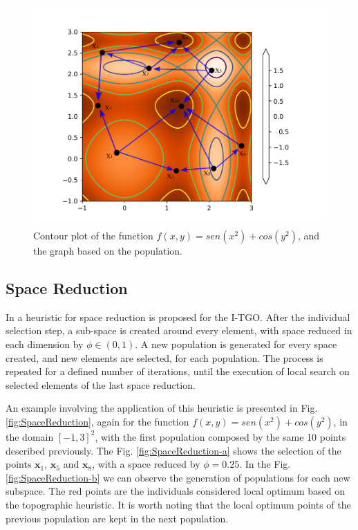 \begin{figure}[tp]
\begin{center}
\includegraphics{fig_1.pdf}
\end{center}
\captionsetup{justification=centering}
\caption{Contour plot of the function $f(x, y) = sen(x^2) + cos(y^2)$, and the graph based on the population.}\label{fig:Graph}
\end{figure}



\subsection{Space Reduction}

In \cite{ITGO4} a heuristic for space reduction is proposed for the I-TGO. After the individual selection step, a sub-space is created around every element, with space reduced in each dimension by $\phi \in (0, 1)$. A new population is generated for every space created, and new elements are selected, for each population. The process is repeated for a defined number of iterations, until the execution of local search on selected elements of the last space reduction.

An example involving the application of this heuristic is presented in Fig. \ref{fig:SpaceReduction}, again for the function $f(x, y) = sen(x^2) + cos(y^2)$, in the domain $[-1, 3]^2$, with the first population composed by the same 10 points described previously. The Fig. \ref{fig:SpaceReduction-a} shows the selection of the points $\bm{x}_1$, $\bm{x}_5$ and $\bm{x}_8$, with a space reduced by $\phi = 0.25$. In the Fig. \ref{fig:SpaceReduction-b} we can observe the generation of populations for each new subspace. The red points are the individuals considered local optimum based on the topographic heuristic. It is worth noting that the local optimum points of the previous population are kept in the next population.


